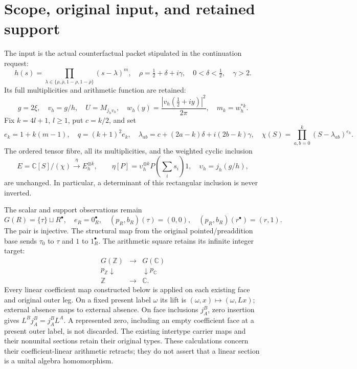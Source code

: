 \documentclass[11pt,a4paper]{article}
\newcommand{\C}{\mathbb C}
\begin{document}
\section{Scope, original input, and retained support}
The input is the actual counterfactual packet stipulated in the continuation request:
\begin{equation}
 h(s)=\prod_{\lambda\in\{\rho,\bar\rho,1-\rho,1-\bar\rho\}}(s-\lambda)^m,
 \quad\rho=\tfrac12+\delta+i\gamma,
 \quad0<\delta<\tfrac12,\quad\gamma>2.
\end{equation}
Its full multiplicities and arithmetic function are retained:
\begin{equation}
 g=2\xi,\quad v_h=g/h,\quad U=M_{j_hv_h},\quad
 w_h(y)=\frac{|v_h(\tfrac12+iy)|^2}{2\pi},\quad m_k=w_h^{*k}.
\end{equation}
Fix $k=4l+1$, $l\ge1$, put $c=k/2$, and set
\begin{equation}
 e_k=1+k(m-1),\quad q=(k+1)^2e_k,\quad
 \lambda_{ab}=c+(2a-k)\delta+i(2b-k)\gamma,
 \quad
 \chi(S)=\prod_{a,b=0}^k(S-\lambda_{ab})^{e_k}.
 \label{eq:packet}
\end{equation}
The ordered tensor fibre, all its multiplicities, and the weighted cyclic inclusion
\begin{equation}
 E=\C[S]/(\chi)\xrightarrow{\eta} E_h^{\otimes k},\qquad
 \eta[P]=\upsilon_h^{\otimes k}P\left(\sum_i s_i\right)1,
 \quad\upsilon_h=j_h(g/h),
 \label{eq:eta}
\end{equation}
are unchanged. In particular, a determinant of this rectangular inclusion is never inverted.

The scalar and support observations remain
\begin{equation}
 G(R)=\{\tau\}\sqcup R^\bullet,\quad e_R=0_R^\bullet,
 \quad(p_R,b_R)(\tau)=(0,0),\quad(p_R,b_R)(r^\bullet)=(r,1).
\end{equation}
The pair is injective. The structural map from the original pointed/preaddition base sends $\tau_0$ to $\tau$ and $1$ to $1_R^\bullet$. The arithmetic square retains its infinite integer target:
\begin{equation}
\begin{array}{ccc}
G(\mathbb Z)&\longrightarrow&G(\C)\\
p_{\mathbb Z}\downarrow&&\downarrow p_{\C}\\
\mathbb Z&\longrightarrow&\C.
\end{array}
\end{equation}
Every linear coefficient map constructed below is applied on each existing face and original outer leg. On a fixed present label $\omega$ its lift is $(\omega,x)\mapsto(\omega,Lx)$; external absence maps to external absence. On face inclusions $j_A^B$, zero insertion gives $L^B j_A^B=j_A^B L^A$. A represented zero, including an empty coefficient face at a present outer label, is not discarded. The existing intertype carrier maps and their nonunital sections retain their original types. These calculations concern their coefficient-linear arithmetic retracts; they do not assert that a linear section is a unital algebra homomorphism.
\end{document}
